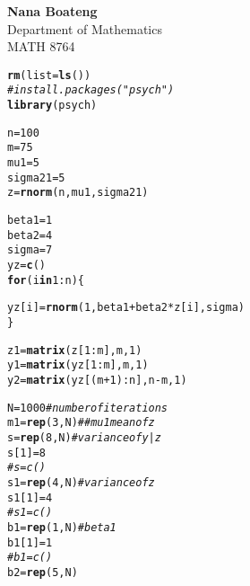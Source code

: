 \documentclass{article}\usepackage[]{graphicx}\usepackage[]{color}
\makeatletter
\newcommand{\hlnum}[1]{\textcolor[rgb]{0.686,0.059,0.569}{#1}}%
\newcommand{\hlcom}[1]{\textcolor[rgb]{0.678,0.584,0.686}{\textit{#1}}}%
\newcommand{\hlopt}[1]{\textcolor[rgb]{0,0,0}{#1}}%
\newcommand{\hlstd}[1]{\textcolor[rgb]{0.345,0.345,0.345}{#1}}%
\newcommand{\hlkwa}[1]{\textcolor[rgb]{0.161,0.373,0.58}{\textbf{#1}}}%
\newcommand{\hlkwb}[1]{\textcolor[rgb]{0.69,0.353,0.396}{#1}}%
\newcommand{\hlkwc}[1]{\textcolor[rgb]{0.333,0.667,0.333}{#1}}%
\newcommand{\hlkwd}[1]{\textcolor[rgb]{0.737,0.353,0.396}{\textbf{#1}}}%
\newenvironment{kframe}{%
 \def\at@end@of@kframe{}%
 \ifinner\ifhmode%
  \def\at@end@of@kframe{\end{minipage}}%
  \begin{minipage}{\columnwidth}%
 \fi\fi%
 \def\FrameCommand##1{\hskip\@totalleftmargin \hskip-\fboxsep
 \colorbox{shadecolor}{##1}\hskip-\fboxsep
     \hskip-\linewidth \hskip-\@totalleftmargin \hskip\columnwidth}%
 \MakeFramed {\advance\hsize-\width
   \@totalleftmargin\z@ \linewidth\hsize
   \@setminipage}}%
 {\par\unskip\endMakeFramed%
 \at@end@of@kframe}
\newenvironment{knitrout}{}{} %
\makeatother
\begin{document}

\begin{center}
{\Large {\bf Nana Boateng}} \\
\vspace{5mm}
{\Large Department of Mathematics} \\
\vspace{5mm}
{\Large MATH 8764} \\
\end{center}




\begin{knitrout}
\color{fgcolor}\begin{kframe}
\begin{alltt}
\hlkwd{rm}\hlstd{(}\hlkwc{list}\hlstd{=}\hlkwd{ls}\hlstd{())}
\hlcom{#install.packages("psych")}
\hlkwd{library}\hlstd{(psych)}
\end{alltt}


{\ttfamily\noindent\bfseries\color{errorcolor}{\#\# Error in library(psych): there is no package called 'psych'}}\begin{alltt}
\hlstd{n}\hlkwb{=}\hlnum{100}
\hlstd{m}\hlkwb{=}\hlnum{75}
\hlstd{mu1}\hlkwb{=}\hlnum{5}
\hlstd{sigma21}\hlkwb{=}\hlnum{5}
\hlstd{z}\hlkwb{=}\hlkwd{rnorm}\hlstd{(n,mu1,sigma21)}

\hlstd{beta1}\hlkwb{=}\hlnum{1}
\hlstd{beta2}\hlkwb{=}\hlnum{4}
\hlstd{sigma}\hlkwb{=}\hlnum{7}
\hlstd{yz}\hlkwb{=}\hlkwd{c}\hlstd{()}
\hlkwa{for} \hlstd{(i} \hlkwa{in} \hlnum{1}\hlopt{:}\hlstd{n)\{}

  \hlstd{yz[i]}\hlkwb{=}\hlkwd{rnorm}\hlstd{(}\hlnum{1}\hlstd{,beta1}\hlopt{+}\hlstd{beta2}\hlopt{*}\hlstd{z[i],sigma)}
\hlstd{\}}

\hlstd{z1}\hlkwb{=}\hlkwd{matrix}\hlstd{(z[}\hlnum{1}\hlopt{:}\hlstd{m],m,}\hlnum{1}\hlstd{)}
\hlstd{y1}\hlkwb{=}\hlkwd{matrix}\hlstd{(yz[}\hlnum{1}\hlopt{:}\hlstd{m],m,}\hlnum{1}\hlstd{)}
\hlstd{y2}\hlkwb{=}\hlkwd{matrix}\hlstd{(yz[(m}\hlopt{+}\hlnum{1}\hlstd{)}\hlopt{:}\hlstd{n],n}\hlopt{-}\hlstd{m,}\hlnum{1}\hlstd{)}


\hlstd{N}\hlkwb{=}\hlnum{1000}  \hlcom{#number of iterations}
\hlstd{m1}\hlkwb{=}\hlkwd{rep}\hlstd{(}\hlnum{3}\hlstd{,N)}  \hlcom{## mu 1  mean of z}
\hlstd{s}\hlkwb{=}\hlkwd{rep}\hlstd{(}\hlnum{8}\hlstd{,N)}  \hlcom{# variance of y|z}
\hlstd{s[}\hlnum{1}\hlstd{]}\hlkwb{=}\hlnum{8}
\hlcom{#s=c()}
\hlstd{s1}\hlkwb{=}\hlkwd{rep}\hlstd{(}\hlnum{4}\hlstd{,N)}  \hlcom{#variance of z}
\hlstd{s1[}\hlnum{1}\hlstd{]}\hlkwb{=}\hlnum{4}
\hlcom{#s1=c()}
\hlstd{b1}\hlkwb{=}\hlkwd{rep}\hlstd{(}\hlnum{1}\hlstd{,N)}  \hlcom{#beta1}
\hlstd{b1[}\hlnum{1}\hlstd{]}\hlkwb{=}\hlnum{1}
\hlcom{#b1=c()}
\hlstd{b2}\hlkwb{=}\hlkwd{rep}\hlstd{(}\hlnum{5}\hlstd{,N)}


\end{alltt}
\end{kframe}
\end{knitrout}
\end{document}
